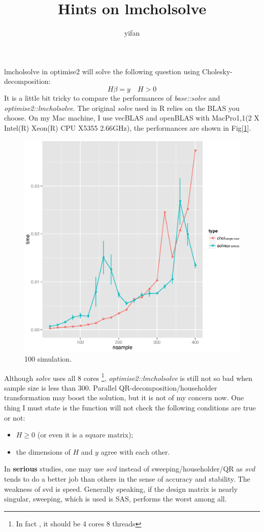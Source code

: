 \documentclass[10pt,letterpaper]{article}
\title{Hints on lmcholsolve}
\author{yifan}
\begin{document}
\maketitle
lmcholsolve in optimise2 will solve the following question using Cholesky-decomposition:
\begin{equation}
H\beta=y\quad H>0
\end{equation}
It is a little bit tricky to compare the performances of \textit{base::solve} and \textit{optimise2::lmcholsolve}. The original \textit{solve} used in R relies on the BLAS you choose. On my Mac machine, I use vecBLAS and openBLAS with MacPro1,1(2 X Intel(R) Xeon(R) CPU  X5355   2.66GHz), the performances are shown in Fig[\ref{perf}].
\begin{figure}[ht]
\centering
\includegraphics[scale=.6]{perf.eps}
\caption{100 simulation.}\label{perf}
\end{figure}
\noindent{}Although \textit{solve} uses all 8 cores \footnote{In fact , it should be 4 cores 8 threads}, \textit{optimise2::lmcholsolve} is still not so bad when sample size is less than 300.  Parallel QR-decomposition/householder transformation may boost the solution, but it is not of my concern now. One thing I must state is the function will not check the following conditions are true or not:
\begin{itemize}
\item[1] $H\geq 0$ (or even it is a square matrix);
\item[2] the dimensions of $H$ and $y$ agree with each other.
\end{itemize}

In \textbf{serious} studies, one may use $svd$ instead of sweeping/householder/QR as $svd$ tends to do a better job than others in the sense of accuracy and stability. The weakness of svd is speed. Generally speaking, if the design matrix is nearly singular, sweeping, which is used is SAS, performs the worst among all.
\end{document}

